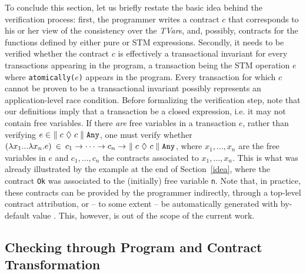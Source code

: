 \documentclass[submission,copyright,creativecommons]{eptcs}
\begin{document}
To conclude this section, let us briefly restate the basic idea behind the verification process: first, the programmer writes a contract $c$ that corresponds to his or her view of the consistency over the \emph{TVar}s, and, possibly, contracts for the functions defined by either pure or STM expressions. Secondly, 
it needs to be verified whether the contract $c$ is effectively a transactional invariant for every transactions appearing in the program, a transaction being the STM operation $e$ where \texttt{atomically(}$e$\texttt{)} appears in the program. 
Every transaction for which $c$ cannot be proven to be a transactional invariant possibly represents an application-level race condition.
Before formalizing the verification step, note that our definitions imply that a transaction be a closed expression, i.e. it may not contain free variables. If there \emph{are} free variables in a transaction $e$, rather than verifying $e \in \ \contractTM{c}{c}{\mathtt{Any}}$, one must verify whether  $(\lambda x_1 ...  \lambda x_n . e)\: \in\: c_1 -> \cdots -> c_n -> \ \parallel c \ \lozenge \ c \parallel \mathtt{Any}$,
 where $x_1,...,x_n$ are the free variables in $e$ and $c_1,...,c_n$  the contracts associated to $x_1,...,x_n$. 
This is what was already illustrated by the example at the end of Section~\ref{idea}, where the contract \texttt{Ok} was associated to the (initially) free variable \texttt{n}. Note that, in practice, these contracts can be provided by the programmer indirectly, through a top-level contract attribution, or -- to some extent -- be automatically generated with by-default value \cite{static-contract-checking}. This, however, is out of the scope of the current work.


\subsection{Checking through Program and Contract Transformation}
\label{checking}
\end{document}
